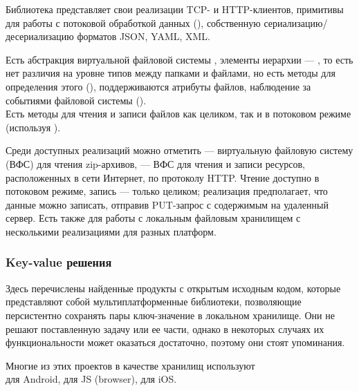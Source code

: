 \begin{itemize}
{        Библиотека представляет свои реализации TCP- и HTTP-клиентов, примитивы для работы с потоковой обработкой данных (), собственную сериализацию/десериализацию форматов JSON, YAML, XML.

        Есть абстракция виртуальной файловой системы , элементы иерархии --- , то есть нет различия на уровне типов между папками и файлами, но есть методы для определения этого (), поддерживаются атрибуты файлов, наблюдение за событиями файловой системы ().\\ Есть методы для чтения и записи файлов как целиком, так и в потоковом режиме (используя ).
        
        Среди доступных реализаций  можно отметить  --- виртуальную файловую систему (ВФС) для чтения zip-архивов,  --- ВФС для чтения и записи ресурсов, расположенных в сети Интернет, по протоколу HTTP. Чтение доступно в потоковом режиме, запись --- только целиком; реализация предполагает, что данные можно записать, отправив PUT-запрос с содержимым на удаленный сервер. Есть также  для работы с локальным файловым хранилищем с несколькими реализациями для разных платформ.
      }
    \end{itemize}

  \subsubsection{Key-value решения}
    Здесь перечислены найденные продукты с открытым исходным кодом, которые представляют собой мультиплатформенные библиотеки, позволяющие персистентно сохранять пары ключ-значение в локальном хранилище. Они не решают поставленную задачу или ее части, однако в некоторых случаях их функциональности может оказаться достаточно, поэтому они стоят упоминания.

    Многие из этих проектов в качестве хранилищ используют\\  для Android,  для JS (browser),  для iOS.

